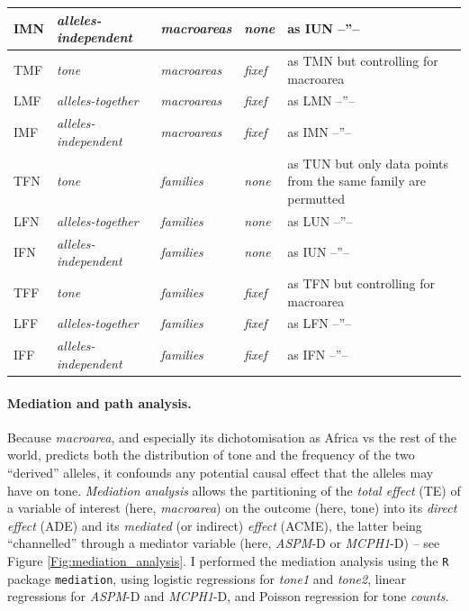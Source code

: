 \documentclass[twoside,onecolumn]{article}
\begin{document}
\begin{table}[h]
\begin{tabularx}{\textwidth}{|l|l|l|l|X|}
    IMN & \textit{alleles-independent} & \textit{macroareas} & \textit{none} & as IUN --''-- \\
    \midrule
    TMF & \textit{tone} & \textit{macroareas} & \textit{fixef} & as TMN but controlling for macroarea \\
    LMF & \textit{alleles-together} & \textit{macroareas} & \textit{fixef} & as LMN --''-- \\
    IMF & \textit{alleles-independent} & \textit{macroareas} & \textit{fixef} & as IMN --''-- \\
    \midrule
    TFN & \textit{tone} & \textit{families} & \textit{none} & as TUN but only data points from the same family are permutted \\
    LFN & \textit{alleles-together} & \textit{families} & \textit{none} & as LUN --''-- \\
    IFN & \textit{alleles-independent} & \textit{families} & \textit{none} & as IUN --''-- \\
    \midrule
    TFF & \textit{tone} & \textit{families} & \textit{fixef} & as TFN but controlling for macroarea \\
    LFF & \textit{alleles-together} & \textit{families} & \textit{fixef} & as LFN --''-- \\
    IFF & \textit{alleles-independent} & \textit{families} & \textit{fixef} & as IFN --''-- \\
    \bottomrule
  \end{tabularx}
\end{table}

\paragraph{Mediation and path analysis.}

Because \textit{macroarea}, and especially its dichotomisation as Africa vs the rest of the world, predicts both the distribution of tone and the frequency of the two ``derived'' alleles, it confounds any potential causal effect that the alleles may have on tone.
\emph{Mediation analysis} \citep{mackinnon_mediation_2007} allows the partitioning of the \emph{total effect} (TE) of a variable of interest (here, \textit{macroarea}) on the outcome (here, tone) into its \emph{direct effect} (ADE) and its \emph{mediated} (or indirect) \emph{effect} (ACME), the latter being ``channelled'' through a mediator variable (here, \textit{ASPM}-D or \textit{MCPH1}-D) -- see Figure \ref{Fig:mediation_analysis}.
I performed the mediation analysis using the \texttt{R} package \texttt{mediation}, using logistic regressions for \textit{tone1} and \textit{tone2}, linear regressions for \textit{ASPM}-D and \textit{MCPH1}-D, and Poisson regression for tone \textit{counts}.
\end{document}
